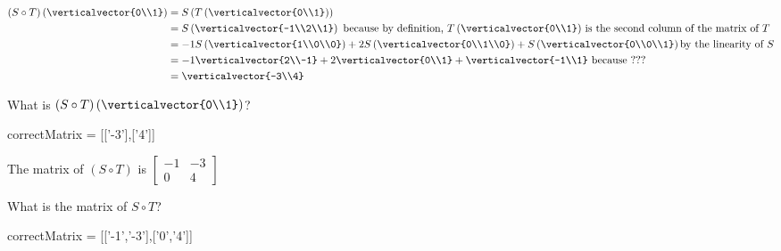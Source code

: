 \documentclass{ximera}
\begin{document}
\begin{question}
\begin{solution}
\begin{hint}
\begin{question}
	\end{question}
	\begin{question}
		\begin{solution}
		\begin{hint}
			\begin{align*}
				(S \circ T)\left(\verticalvector{0\\1}\right) &= S\left(T\left(\verticalvector{0\\1}\right)\right)\\
				&= S\left(\verticalvector{-1\\2\\1}\right) \text{ because by definition, $T\left(\verticalvector{0\\1}\right)$ is the second column of the matrix of $T$}\\
				&=-1S\left(\verticalvector{1\\0\\0}\right) +2 S\left(\verticalvector{0\\1\\0}\right) + S\left(\verticalvector{0\\0\\1}\right)\text{by the linearity of $S$}\\
				&=-1\verticalvector{2\\-1}+2\verticalvector{0\\1} +\verticalvector{-1\\1}\text{ because ???}\\
				&=\verticalvector{-3\\4}
			\end{align*}
		\end{hint}
		What is  $(S \circ T)\left(\verticalvector{0\\1}\right)$?
			\begin{matrix-answer}[name=M]
 			   correctMatrix = [['-3'],['4']]
 			 \end{matrix-answer}
		\end{solution}
		
	\end{question}
\end{hint}
\begin{hint}
	The matrix of $(S \circ T)$ is $\begin{bmatrix} -1 & -3\\0 & 4 \end{bmatrix}$
\end{hint}
  What is the matrix of $S \circ T$?

  \begin{matrix-answer}[name=M]
    correctMatrix = [['-1','-3'],['0','4']]
  \end{matrix-answer}
\end{solution}


\end{question}
\end{document}

